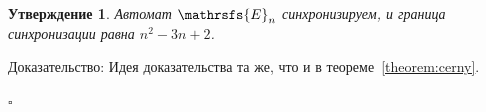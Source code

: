 \documentclass[11pt]{article}
\newtheorem{theorem}{Утверждение}
\newenvironment{proof}{Доказательство:}{$\square$}
\begin{document}
\begin{theorem}
Автомат $\mathrsfs{E}_n$ синхронизируем, и граница синхронизации равна $n^2 - 3n + 2$.
\end{theorem}
\begin{proof}
Идея доказательства та же, что и в теореме~\ref{theorem:cerny}.

\end{proof}
\end{document}
